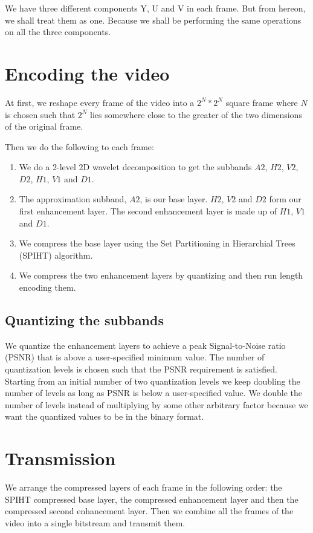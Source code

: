 \documentclass[10pt,twocolumn]{article}
\begin{document}
We have three different components Y, U and V in each frame. But from hereon, we shall treat them as one. Because we shall be performing the same operations on all the three components.

\section{Encoding the video}

At first, we reshape every frame of the video into a $2^N * 2^N$ square frame where $N$ is chosen such that $2^N$ lies somewhere close to the greater of the two dimensions of the original frame.

Then we do the following to each frame:
\begin{enumerate}
    \item We do a 2-level 2D wavelet decomposition to get the subbands $A2$, $H2$, $V2$, $D2$, $H1$, $V1$ and $D1$.
    \item The approximation subband, $A2$, is our base layer. $H2$, $V2$ and $D2$ form our first enhancement layer. The second enhancement layer is made up of $H1$, $V1$ and $D1$.
    \item We compress the base layer using the Set Partitioning in Hierarchial Trees (SPIHT) algorithm\cite{amirSaid1996}.
    \item We compress the two enhancement layers by quantizing and then run length encoding them.
\end{enumerate}

\subsection*{Quantizing the subbands}

We quantize the enhancement layers to achieve a peak Signal-to-Noise ratio (PSNR) that is above a user-specified minimum value. The number of quantization levels is chosen such that the PSNR requirement is satisfied. Starting from an initial number of two quantization levels we keep  doubling the number of levels as long as PSNR is below a user-specified value. We double the number of levels instead of multiplying by some other arbitrary factor because we want the quantized values to be in the binary format.

\section{Transmission}

We arrange the compressed layers of each frame in the following order: the SPIHT compressed base layer, the compressed enhancement layer and then the compressed second enhancement layer.
Then we combine all the frames of the video into a single bitstream and transmit them.
\end{document}
